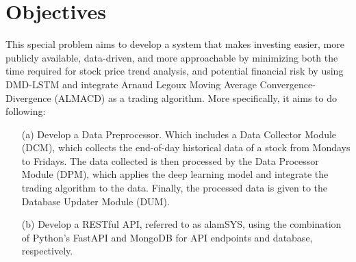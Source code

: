 \section{Objectives}
\label{sec:objectives}
This special problem aims to develop a system that makes investing easier, 
more publicly available, data-driven, and more approachable by minimizing both the 
time required for stock price trend analysis, and potential financial risk 
by using DMD-LSTM and integrate Arnaud Legoux Moving Average Convergence-Divergence (ALMACD)
as a trading algorithm. More specifically, it aims to do following:
\begin{itemize}
  \item[(a)] Develop a Data Preprocessor. Which includes a Data Collector Module (DCM), 
  which collects the end-of-day historical data of a stock from Mondays to Fridays. 
  The data collected is then processed by the Data Processor Module (DPM), which applies the
  deep learning model and integrate the trading algorithm to the data. Finally, the
  processed data is given to the Database Updater Module (DUM).
  \item[(b)] Develop a RESTful API, referred to as alamSYS, 
  using the combination of Python's FastAPI and MongoDB for API 
  endpoints and database, respectively.
  \hfill \\
  

\end{itemize}
